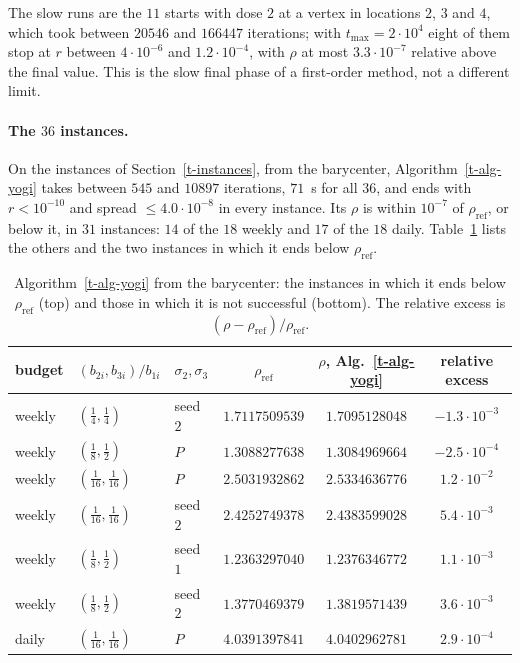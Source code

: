 \documentclass[11pt]{article}
\theoremstyle{plain}
\theoremstyle{remark}
\numberwithin{equation}{section}
\begin{document}
The slow runs are the $11$ starts with dose $2$ at a vertex in locations $2$,
$3$ and $4$, which took between $20546$ and $166447$ iterations; with
$t_{\max}=2\cdot 10^4$ eight of them stop at
$r$ between $4\cdot 10^{-6}$ and $1.2\cdot 10^{-4}$, with $\rho$ at most
$3.3\cdot 10^{-7}$ relative above the final value. This is the slow final
phase of a first-order method, not a different limit.

\paragraph{The $36$ instances.} On the instances of Section~\ref{t-instances},
from the barycenter, Algorithm~\ref{t-alg-yogi} takes between $545$ and
$10897$ iterations, $71$~s for all $36$, and ends with $r<10^{-10}$ and spread
$\le 4.0\cdot 10^{-8}$ in every instance. Its $\rho$ is within $10^{-7}$ of
$\rho_{\mathrm{ref}}$, or below it, in $31$ instances: $14$ of the $18$ weekly
and $17$ of the $18$ daily. Table~\ref{t-tab-yogi-inst} lists the others and
the two instances in which it ends below $\rho_{\mathrm{ref}}$.

\begin{table}[ht]
\centering
\small
\begin{tabular}{lllccc}
\hline
budget & $(b_{2i},b_{3i})/b_{1i}$ & $\sigma_2,\sigma_3$ & $\rho_{\mathrm{ref}}$ &
$\rho$, Alg.~\ref{t-alg-yogi} & relative excess\\
\hline
weekly & $(\tfrac14,\tfrac14)$       & seed $2$ & $1.7117509539$ & $1.7095128048$ & $-1.3\cdot 10^{-3}$\\
weekly & $(\tfrac18,\tfrac12)$       & $P$      & $1.3088277638$ & $1.3084969664$ & $-2.5\cdot 10^{-4}$\\
\hline
weekly & $(\tfrac1{16},\tfrac1{16})$ & $P$      & $2.5031932862$ & $2.5334636776$ & $1.2\cdot 10^{-2}$\\
weekly & $(\tfrac1{16},\tfrac1{16})$ & seed $2$ & $2.4252749378$ & $2.4383599028$ & $5.4\cdot 10^{-3}$\\
weekly & $(\tfrac18,\tfrac12)$       & seed $1$ & $1.2363297040$ & $1.2376346772$ & $1.1\cdot 10^{-3}$\\
weekly & $(\tfrac18,\tfrac12)$       & seed $2$ & $1.3770469379$ & $1.3819571439$ & $3.6\cdot 10^{-3}$\\
daily  & $(\tfrac1{16},\tfrac1{16})$ & $P$      & $4.0391397841$ & $4.0402962781$ & $2.9\cdot 10^{-4}$\\
\hline
\end{tabular}
\caption{Algorithm~\ref{t-alg-yogi} from the barycenter: the instances in which
it ends below $\rho_{\mathrm{ref}}$ (top) and those in which it is not
successful (bottom). The relative excess is
$(\rho-\rho_{\mathrm{ref}})/\rho_{\mathrm{ref}}$.}\label{t-tab-yogi-inst}
\end{table}
\end{document}
